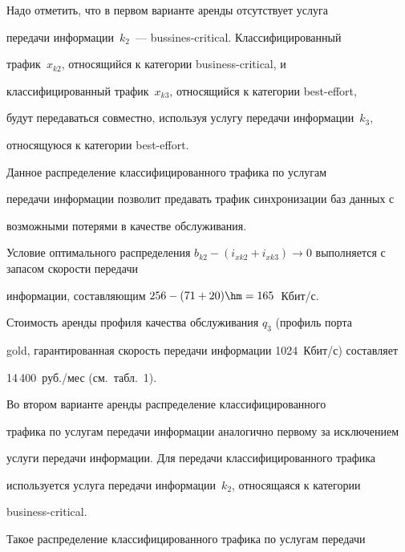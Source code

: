      


     Надо отметить, что в первом варианте аренды отсутствует услуга 


передачи информации~$k_2$~--- bussines-critical.  Классифицированный 


трафик~$x_{k2}$, относящийся к категории business-critical, и 


классифицированный трафик~$x_{k3}$, относящийся к категории best-effort, 


будут передаваться совместно, используя  услугу передачи информации~$k_3$, 


относящуюся к категории best-effort. 


     


     Данное распределение классифицированного трафика по услугам 


передачи информации позволит предавать трафик синхронизации баз данных с 


возможными потерями в качестве обслуживания.


     


     Условие оптимального распределения $b_{k2}-


(i_{xk2}+i_{xk3})\rightarrow 0$ выполняется с запасом скорости передачи 


информации, составляющим $256 - (71+20) \hm= 165$~Кбит/с. 


     


      Стоимость аренды профиля качества обслуживания $q_3$ (профиль порта 


gold, гарантированная скорость передачи информации 1024~Кбит/с) составляет 


14\,400~руб./\!мес (см.\ табл.~1).


     


     Во втором варианте аренды распределение классифицированного 


трафика по услугам передачи информации аналогично первому за исключением 


услуги передачи информации. Для передачи классифицированного трафика 


используется услуга передачи информации~$k_2$, относящаяся к категории 


business-critical.


     


     Такое распределение классифицированного трафика по услугам передачи 


